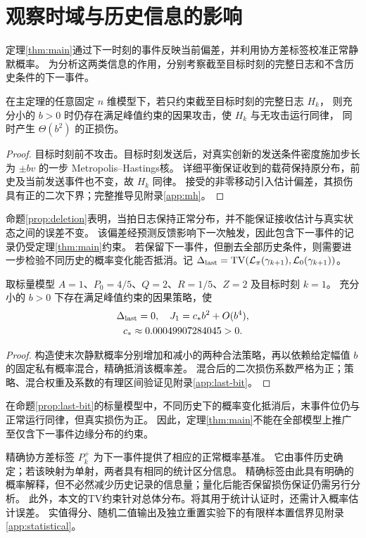 \section{观察时域与历史信息的影响}
\label{sec:records}
定理\ref{thm:main}通过下一时刻的事件反映当前偏差，并利用协方差标签校准正常静默概率。
为分析这两类信息的作用，分别考察截至目标时刻的完整日志和不含历史条件的下一事件。
\begin{proposition}[当拍截止记录的局限]
\label{prop:deletion}
在主定理的任意固定 $n$ 维模型下，若只约束截至目标时刻的完整日志 $H_k$，
则充分小的 $b>0$ 时仍存在满足峰值约束的因果攻击，使 $H_k$ 与无攻击运行同律，
同时产生 $\Theta(b^2)$ 的正损伤。
\end{proposition}
\begin{proof}
目标时刻前不攻击。目标时刻发送后，对真实创新的发送条件密度施加步长为 $\pm bv$ 的一步
Metropolis--Hastings核\cite{metropolis1953,hastings1970}。
详细平衡保证收到的载荷保持原分布，前史及当前发送事件也不变，故 $H_k$ 同律。
接受的非零移动引入估计偏差，其损伤具有正的二次下界；完整推导见附录\ref{app:mh}。
\end{proof}

命题\ref{prop:deletion}表明，当拍日志保持正常分布，并不能保证接收估计与真实状态之间的误差不变。
该偏差经预测反馈影响下一次触发，因此包含下一事件的记录仍受定理\ref{thm:main}约束。
若保留下一事件，但删去全部历史条件，则需要进一步检验不同历史的概率变化能否抵消。记
$\Delta_{\rm last}=\operatorname{TV}(\mathcal L_\pi(\gamma_{k+1}),\mathcal L_0(\gamma_{k+1}))$。
\begin{proposition}[末事件位的标量反例]
\label{prop:last-bit}
取标量模型 $A=1$、$P_0=4/5$、$Q=2$、$R=1/5$、$Z=2$ 及目标时刻 $k=1$。
充分小的 $b>0$ 下存在满足峰值约束的因果策略，使
\begin{equation}
 \begin{gathered}
 \Delta_{\rm last}=0,\quad J_1=c_*b^2+O(b^4),\\
 c_*\approx0.00049907284045>0.
 \end{gathered}
 \label{eq:last-counterexample}
\end{equation}
\end{proposition}
\begin{proof}
构造使末次静默概率分别增加和减小的两种合法策略，再以依赖给定幅值 $b$ 的固定私有概率混合，精确抵消该概率差。
混合后的二次损伤系数严格为正；策略、混合权重及系数的有理区间验证见附录\ref{app:last-bit}。
\end{proof}
在命题\ref{prop:last-bit}的标量模型中，不同历史下的概率变化抵消后，末事件位仍与正常运行同律，但真实损伤为正。
因此，定理\ref{thm:main}不能在全部模型上推广至仅含下一事件边缘分布的约束。

精确协方差标签 $P_k^+$ 为下一事件提供了相应的正常概率基准。
它由事件历史确定；若该映射为单射，两者具有相同的统计区分信息。
精确标签由此具有明确的概率解释，但不必然减少历史记录的信息量；量化后能否保留损伤保证仍需另行分析。
此外，本文的TV约束针对总体分布。将其用于统计认证时，还需计入概率估计误差。
实值得分、随机二值输出及独立重置实验下的有限样本置信界见附录\ref{app:statistical}。
